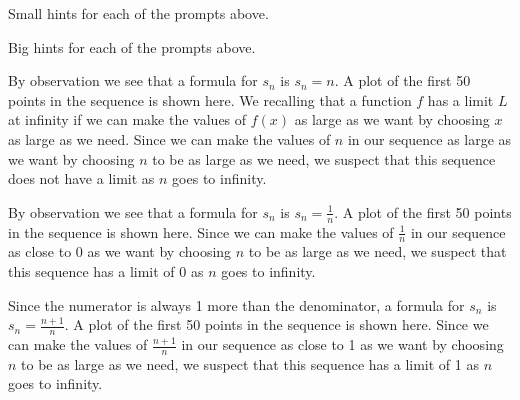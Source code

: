\begin{smallhint}
\ba
	\item Small hints for each of the prompts above.
\ea
\end{smallhint}
\begin{bighint}
\ba
	\item Big hints for each of the prompts above.
\ea
\end{bighint}
\begin{activitySolution}
\ba
	\item By observation we see that a formula for $s_n$ is $s_n = n$. A plot of the first 50 points in the sequence is shown here.
We recalling that a function $f$ has a limit $L$ at infinity if we can make the values of $f(x)$ as large as we want by choosing $x$ as large as we need. Since we can make the values of $n$ in our sequence as large as we want by choosing $n$ to be as large as we need, we suspect that this sequence does not have a limit as $n$ goes to infinity.

\item By observation we see that a formula for $s_n$ is $s_n = \frac{1}{n}$. A plot of the first 50 points in the sequence is shown here.
Since we can make the values of $\frac{1}{n}$ in our sequence as close to 0 as we want by choosing $n$ to be as large as we need, we suspect that this sequence has a limit of 0 as $n$ goes to infinity.

\item Since the numerator is always 1 more than the denominator, a formula for $s_n$ is $s_n = \frac{n+1}{n}$. A plot of the first 50 points in the sequence is shown here.
Since we can make the values of $\frac{n+1}{n}$ in our sequence as close to 1 as we want by choosing $n$ to be as large as we need, we suspect that this sequence has a limit of 1 as $n$ goes to infinity.

\ea
\end{activitySolution}
\aftera 